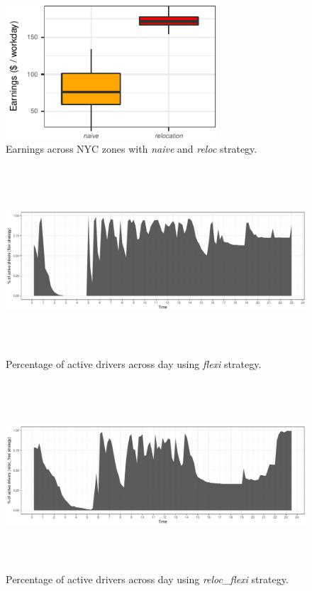 \begin{figure}
	\label{fig:earnings_heatmap}
	\caption{Earnings across NYC zones with \textit{naive} and \textit{reloc} strategy.}
	\includegraphics[width=0.7\textwidth,height=0.3\textwidth]{figures/earnings_heatmap.pdf}
\end{figure}

\begin{figure}
	\label{fig:flexi_schedules}
	\caption{Percentage of active drivers across day using \textit{flexi} strategy.}
	\includegraphics[width=\textwidth,height=7cm]{figures/flexi_schedules.pdf}
\end{figure}

\begin{figure}
	\label{fig:reloc_flexi_schedules}
	\caption{Percentage of active drivers across day using \textit{reloc\_flexi} strategy.}
	\includegraphics[width=\textwidth,height=7cm]{figures/reloc_flexi_schedules.pdf}
\end{figure}

